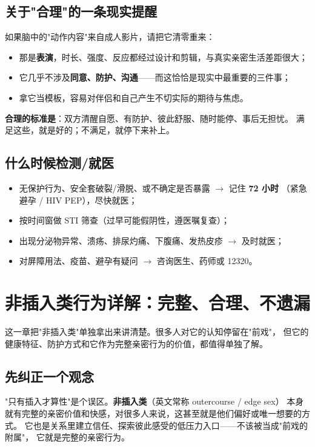 \section{关于"合理"的一条现实提醒}

如果脑中的"动作内容"来自成人影片，请把它清零重来：

\begin{itemize}[leftmargin=2em]
  \item 那是\textbf{表演}，时长、强度、反应都经过设计和剪辑，与真实亲密生活差距很大；
  \item 它几乎不涉及\textbf{同意、防护、沟通}——而这恰恰是现实中最重要的三件事；
  \item 拿它当模板，容易对伴侣和自己产生不切实际的期待与焦虑。
\end{itemize}

\textbf{合理的标准是}：双方清醒自愿、有防护、彼此舒服、随时能停、事后无担忧。
满足这些，就是好的；不满足，就停下来补上。

\section{什么时候检测/就医}

\begin{itemize}[leftmargin=2em]
  \item 无保护行为、安全套破裂/滑脱、或不确定是否暴露 $\to$ 记住 \textbf{72 小时}
        （紧急避孕 / HIV PEP），尽快就医；
  \item 按时间窗做 STI 筛查（过早可能假阴性，遵医嘱复查）；
  \item 出现分泌物异常、溃疡、排尿灼痛、下腹痛、发热皮疹 $\to$ 及时就医；
  \item 对屏障用法、疫苗、避孕有疑问 $\to$ 咨询医生、药师或 12320。
\end{itemize}

\chapter{非插入类行为详解：完整、合理、不遗漏}
\label{chap:outer}

这一章把"非插入类"单独拿出来讲清楚。很多人对它的认知停留在"前戏"，
但它的健康特征、防护方式和它作为完整亲密行为的价值，都值得单独了解。

\section{先纠正一个观念}

"只有插入才算性"是个误区。\textbf{非插入类}（英文常称 outercourse / edge sex）
本身就有完整的亲密价值和快感，对很多人来说，这甚至就是他们偏好或唯一想要的方式。
它也是关系里建立信任、探索彼此感受的低压力入口——不该被当成"前戏的附属"，
它就是完整的亲密行为。

